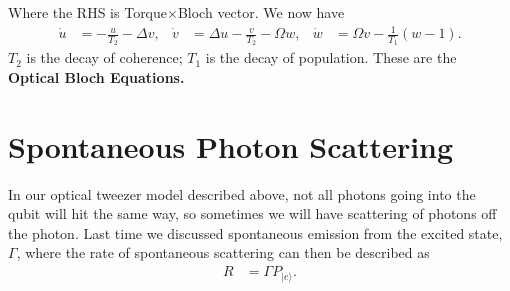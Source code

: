 \documentclass[a4paper, 11pt, normalem]{report}
\begin{document}
Where the RHS is Torque$\times$Bloch vector.
We now have
\begin{align}
    \dot{u} &= -\frac{u}{T_2} - \Delta v, &
    \dot{v} &= \Delta u - \frac{v}{T_2} - \Omega w, &
    \dot{w} &= \Omega v - \frac{1}{T_1}(w-1).
\end{align}
$T_2$ is the decay of coherence; $T_1$ is the decay of population.
These are the \textbf{Optical Bloch Equations.}

\chapter{Spontaneous Photon Scattering}
In our optical tweezer model described above, not all photons going into the qubit will hit the same way, so sometimes we will have scattering of photons off the photon.
Last time we discussed spontaneous emission from the excited state, $\Gamma$, where the rate of spontaneous scattering can then be described as
\begin{align}
    R &= \Gamma P_{|e\rangle}.
\end{align}
\end{document}
